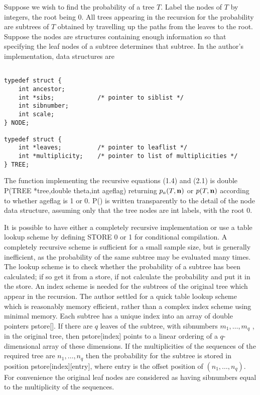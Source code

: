     Suppose we wish to find the probability of a tree $T$. Label the nodes
of $T$ by integers, the root being 0. All trees appearing in 
the recursion for the probability are subtrees of $T$ obtained by travelling
up the paths from the leaves to the root. Suppose the nodes are
structures containing enough information so that specifying the leaf
nodes of a subtree determines that subtree. In the author's implementation,
data structures are\\
\begin{verbatim}

typedef struct {
    int ancestor;
    int *sibs;            /* pointer to siblist */
    int sibnumber;
    int scale;
} NODE;

typedef struct {
    int *leaves;          /* pointer to leaflist */
    int *multiplicity;    /* pointer to list of multiplicities */
} TREE;
\end{verbatim}

The function implementing the recursive
equations (1.4) and (2.1)
is {\sf double P(TREE *tree,double theta,int ageflag) } returning 
$p_a(T,{\bf n})$ or $p(T,{\bf n})$ according  to whether {\sf ageflag}
is 1 or 0.
{\sf P()} is written transparently to the detail of the node data structure,  
assuming only that the tree nodes are {\sf int } labels, with the root $0$.

It is possible to have either a completely recursive implementation
or use a table lookup scheme by defining {\sf STORE} 0 or 1 for conditional
compilation.
A completely recursive scheme is sufficient for a small sample size, but is
generally inefficient, as the probability of the same 
subtree may be evaluated many times. The lookup scheme is to check whether
the probability of a subtree has been calculated; if so get it from a store,
if not calculate the probability and put it in the store. An index scheme
is needed for the subtrees of the original tree which appear in the recursion.
The author settled for a quick table lookup scheme which is reasonably
memory efficient, rather than a complex index scheme using minimal memory.
Each subtree has a unique index into an array of
double pointers {\sf pstore[]}. If there are $q$ leaves of the subtree, with
sibnumbers $m_1, \ldots ,m_q$ , in the original tree, then {\sf pstore[index]}
points to a linear ordering of a $q$-dimensional array of these dimensions. 
If the multiplicities
of the sequences of the required tree
are $n_1, \ldots ,n_q$ then the probability for the subtree 
is stored in position {\sf pstore[index][entry]}, where {\sf entry} 
is the offset
position of $(n_1,\ldots ,n_q)$.
For convenience the original leaf nodes are considered as having 
sibnumbers equal to the multiplicity of the sequences.

